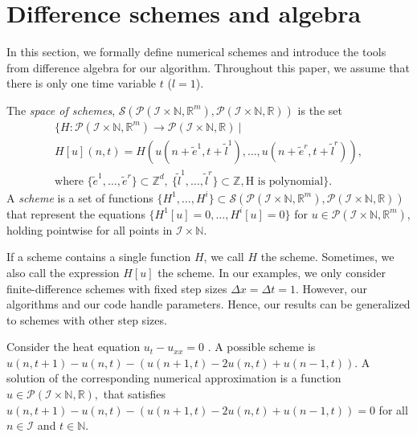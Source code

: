 \documentclass[runningheads]{llncs}
\newcommand{\Rr}{\mathbb{R}}
\newcommand{\Nn}{\mathbb{N}}
\newcommand{\Zz}{{\mathbb{Z}}}
\newcommand{\1}{\chi}
\newcommand{\Ii}{\mathcal{I}}
\begin{document}
\section{Difference schemes and algebra}
\label{algodetec}
In this section, we formally define numerical schemes and introduce the tools from difference algebra for our algorithm.
Throughout this paper, we assume that there is only one time variable $t$ ($l=1$).
\begin{definition}
	The \emph{space of schemes}, $	\mathcal{S}(\mathcal{P}(\Ii\times\Nn,\Rr^m),\mathcal{P}(\Ii\times\Nn,\Rr))$ is the set
	\begin{gather*}
		\Bigg\{H:\mathcal{P}(\Ii\times\Nn,\Rr^m)\rightarrow\mathcal{P}(\Ii\times\Nn,\Rr)\ \Bigg|\\
		H[u](n,t)=H(u(n+\tilde{e}^1,t+\tilde{l}^1),\ldots,u(n+\tilde{e}^r,t+\tilde{l}^r)),\\
		\text{where }
		\{\tilde{e}^1,\ldots,\tilde{e}^r\}\subset\Zz^d,\ \{\tilde{l}^1,\ldots,\tilde{l}^r\}\subset\Zz,
		\text{H is polynomial}
		\Bigg\}.
	\end{gather*}
	A \emph{scheme} is a set of functions
$
		\{H^1,\ldots,H^i\}\subset\mathcal{S}(\mathcal{P}(\Ii\times\Nn,\Rr^m),\mathcal{P}(\Ii\times\Nn,\Rr))
$
	that represent the equations $\{H^1[u]=0,\ldots,H^i[u]=0\}$ for $u\in\mathcal{P}(\Ii\times\Nn,\Rr^m)$, holding pointwise for all points in $\Ii\times\Nn$.
\end{definition}
If a scheme contains a single function $H$, we call $H$ the scheme. Sometimes, we also call the expression $H[u]$ the scheme.
	In our examples, we only consider finite-difference schemes with fixed step sizes $\Delta x=\Delta t=1$. However, our algorithms and our code handle parameters. Hence, our results can be generalized to schemes with other step sizes.
\begin{example}
	\label{ee}
Consider the heat equation	$u_t-u_{xx}=0$ \cite{smoller94}.  A possible scheme is
$
		u(n,t+1)-u(n,t)-(u(n+1,t)-2u(n,t)+u(n-1,t)).
$
A solution of the corresponding numerical approximation is a function $u\in \mathcal{P}(\Ii\times\Nn,\Rr),$ that satisfies
$
		u(n,t+1)-u(n,t)-(u(n+1,t)-2u(n,t)+u(n-1,t))=0
$
for all $n\in \Ii$ and $t\in \Nn$. 
\end{example}
\end{document}
